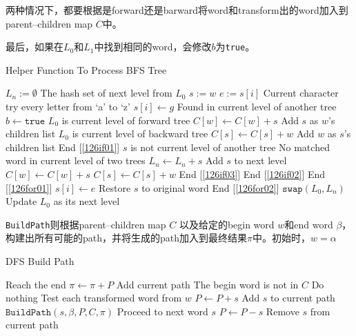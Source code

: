 两种情况下，都要根据是forward还是barward将word和transform出的word加入到parent--children map $C$中。

最后，如果在$L_0$和$L_1$中找到相同的word，会修改$b$为\texttt{true}。
\begin{algorithm}[H]
\caption{Helper Function To Process BFS Tree}
\begin{algorithmic}[1]
\State $L_n:=\emptyset$ \Comment The hash set of next level from $L_0$
\State $s:=w$ 
 \label{126for02}
\State $e:=s[i]$ \Comment Current character
 \Comment try every letter from `a' to `z' \label{126for01}
\State $s[i]\gets g$
 \Comment Found in current level of another tree \label{126if02}
\State $b\gets \texttt{true}$
 \Comment $L_0$ is current level of forward tree \label{126if01}
\State $C[w]\gets C[w] + s$ \Comment Add $s$ as $w$'s children list
\Else \Comment $L_0$ is current level of backward tree
\State $C[s]\gets C[s] + w$ \Comment Add $w$ as $s$'s children list
\EndIf \Comment End [\ref{126if01}]
\Else \Comment $s$ is not current level of another tree
 \Comment No matched word in current level of two trees \label{126if03}
\State $L_n\gets L_n+s$ \Comment Add $s$ to next level
\State $C[w]\gets C[w] + s$ 
\Else 
\State $C[s]\gets C[s] + w$ 
\EndIf 
\EndIf \Comment End [\ref{126if03}]
\EndIf \Comment End [\ref{126if02}]
\EndFor \Comment End [\ref{126for01}]
\State $s[i]\gets e$ \Comment Restore $s$ to original word 
\EndFor \Comment End [\ref{126for02}]
\EndFor
\State $\texttt{swap}(L_0, L_n)$ \Comment Update $L_0$ as its next level
\EndFunction
\end{algorithmic}
\end{algorithm}
\texttt{BuildPath}则根据parent--children map $C$ 以及给定的begin word $w$和end word $\beta$，构建出所有可能的path，并将生成的path加入到最终结果$\pi$中。初始时，$w=\alpha$
\begin{algorithm}[H]
\caption{DFS Build Path}
\begin{algorithmic}[1]
 \Comment Reach the end
\State $\pi\gets \pi + P$ \Comment Add current path
\State \Return
\EndIf
{} \Comment The begin word is not in $C$
\State \Return \Comment Do nothing
\EndIf
{} \Comment Test each transformed word from $w$
\State $P\gets P + s$ \Comment Add $s$ to current path
\State $\texttt{BuildPath}(s, \beta, P, C, \pi)$ \Comment Proceed to next word $s$
\State $P\gets P - s$ \Comment Remove $s$ from current path
\EndFor
\EndFunction
\end{algorithmic}
\end{algorithm}